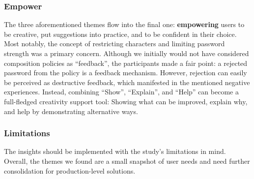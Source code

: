 


\subsubsection{Empower}
The three aforementioned themes flow into the final one: \textbf{empowering} users to be creative, put suggestions into practice, and to be confident in their choice. Most notably, the concept of restricting characters and limiting password strength was a primary concern. Although we initially would not have considered composition policies as ``feedback'', the participants made a fair point: a rejected password from the policy is a feedback mechanism. However, rejection can easily be perceived as destructive feedback, which manifested in the mentioned negative experiences. Instead, combining ``Show'', ``Explain'', and ``Help'' can become a full-fledged creativity support tool: Showing what can be improved, explain why, and help by demonstrating alternative ways.




\subsubsection{Limitations}
The insights should be implemented with the study's limitations in mind. Overall, the themes we found are a small snapshot of user needs and need further consolidation for production-level solutions. 

